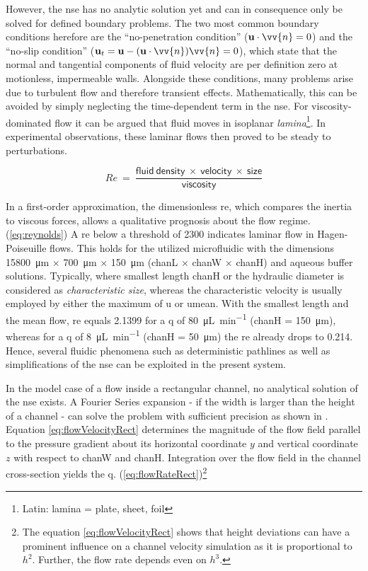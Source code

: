 However, the \gls{nse} has no analytic solution yet and can in consequence only be solved for defined boundary problems. The two most common boundary conditions herefore are the ``no-penetration condition'' ($\mathbf{u} \cdot \vv{n} = 0$) and the ``no-slip condition'' ($\mathbf{u}_t = \mathbf{u} - (\mathbf{u}\cdot \vv{n}) \vv{n} = 0$), which state that the normal and tangential components of fluid velocity are per definition zero at motionless, impermeable walls.\newline
Alongside these conditions, many problems arise due to turbulent flow and therefore transient effects. Mathematically, this can be avoided by simply neglecting the time-dependent term in the \gls{nse}. For viscosity-dominated flow it can be argued that fluid moves in isoplanar \textit{lamina}\footnote{Latin: lamina = plate, sheet, foil}. In experimental observations, these laminar flows then proved to be steady to perturbations.

\begin{equation}
	\mathit{Re}\ =\ \frac{\mathrm{\mathsf{fluid\ density\ \times \ velocity\ \times\ size}}}{\mathrm{\mathsf{viscosity}}} \label{eq:reynolds}
\end{equation}

In a first-order approximation, the dimensionless \gls{re}, which compares the inertia to viscous forces, allows a qualitative prognosis about the flow regime. (\cref{eq:reynolds}) A \gls{re} below a threshold of 2300 indicates laminar flow in Hagen-Poiseuille flows. This holds for the utilized microfluidic with the dimensions \SI{15800}{\micro\meter} $\times$ \SI{700}{\micro\meter} $\times$ \SI{150}{\micro\meter} (\gls{chanL} $\times$ \gls{chanW} $\times$ \gls{chanH}) and aqueous buffer solutions. Typically, where smallest length \gls{chanH} or the hydraulic diameter is considered as \textit{characteristic size}, whereas the characteristic velocity is usually employed by either the maximum of \gls{u} or \gls{umean}. With the smallest length and the mean flow, \gls{re} equals \num{2.1399} for a \gls{q} of \SI{80}{\micro\liter\per\minute} (\gls{chanH} = \SI{150}{\micro\meter}), whereas for a \gls{q} of \SI{8}{\micro\liter\per\minute} (\gls{chanH} = \SI{50}{\micro\meter}) the \acrlong{re} already drops to \num{0.214}.  Hence, several fluidic phenomena such as deterministic pathlines as well as simplifications of the \gls{nse} can be exploited in the present system. 

In the model case of a flow inside a rectangular channel, no analytical solution of the \gls{nse} exists. A Fourier Series expansion - if the width is larger than the height of a channel - can solve the problem with sufficient precision as shown in \citet{lit:fluidic:bruus}. Equation \cref{eq:flowVelocityRect} determines the magnitude of the flow field parallel to the pressure gradient about its horizontal coordinate $y$ and vertical coordinate $z$ with respect to \gls{chanW} and \gls{chanH}. Integration over the flow field in the channel cross-section yields the \gls{q}. (\cref{eq:flowRateRect})\footnote{The equation \cref{eq:flowVelocityRect} shows that height deviations can have a prominent influence on a channel velocity simulation as it is proportional to $h^2$. Further, the flow rate depends even on $h^3$.} 


